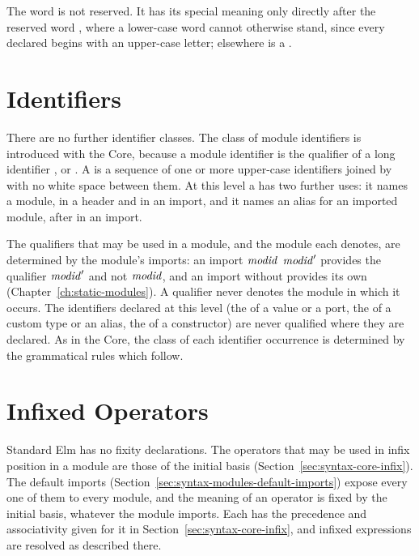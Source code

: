 The word  is not reserved. It has its special meaning only directly
after the reserved word , where a lower-case word cannot otherwise
stand, since every declared \tycon{} begins with an upper-case letter;
elsewhere  is a \var.

\section{Identifiers}\label{sec:syntax-modules-identifiers}

There are no further identifier classes. The class  of module
identifiers is introduced with the Core, because a module identifier is the
qualifier of a long identifier \longvar, \longcon{} or \longtycon. A \modid{}
is a sequence of one or more upper-case identifiers joined by  with no
white space between them. At this level a \modid{} has two further uses: it
names a module, in a header and in an import, and it names an alias for an
imported module, after  in an import.

The qualifiers that may be used in a module, and the module each denotes, are
determined by the module's imports: an import  $\mathit{modid}$ 
$\mathit{modid}'$ provides the qualifier $\mathit{modid}'$ and not $\mathit{modid}$, and an import
without  provides its own \modid{} (Chapter~\ref{ch:static-modules}).
A qualifier never denotes the module in which it occurs.
The identifiers declared at this level (the \var{} of a value or a port, the
\tycon{} of a custom type or an alias, the \con{} of a constructor) are never
qualified where they are declared. As in the Core, the class of each
identifier occurrence is determined by the grammatical rules which follow.

\section{Infixed Operators}\label{sec:syntax-modules-infix}

Standard Elm has no fixity declarations.
The operators that may be used in infix position in a module are those of
the initial basis (Section~\ref{sec:syntax-core-infix}). The default imports
(Section~\ref{sec:syntax-modules-default-imports}) expose every one of them
to every module, and the meaning of an operator is fixed by the initial basis,
whatever the module imports. Each has the precedence and associativity given
for it in Section~\ref{sec:syntax-core-infix}, and infixed expressions are
resolved as described there.

